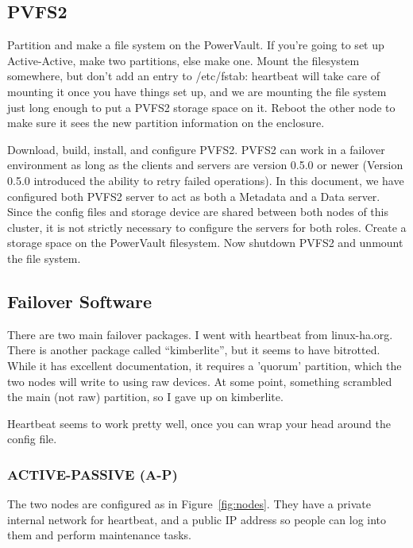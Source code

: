 \documentclass[11pt]{article}
\begin{document}
\subsection{PVFS2}

Partition and make a file system on the PowerVault.  If you're going to
set up Active-Active, make two partitions, else make one.  Mount the
filesystem somewhere, but don't add an entry to /etc/fstab: heartbeat
will take care of mounting it once you have things set up, and we are
mounting the file system just long enough to put a PVFS2 storage space
on it.  Reboot the other node to make sure it sees the new partition
information on the enclosure.

Download, build, install, and configure PVFS2.  PVFS2 can work in a
failover environment as long as the clients and servers are version
0.5.0 or newer (Version 0.5.0 introduced the ability to retry failed
operations). In this document, we have configured both PVFS2 server to
act as both a Metadata and a Data server.  Since the config files and
storage device are shared between both nodes of this cluster, it is not
strictly necessary to configure the servers for both roles. Create a
storage space on the PowerVault filesystem.  Now shutdown PVFS2 and
unmount the file system.  

\subsection{Failover Software}

There are two main failover packages.  I went with heartbeat from
linux-ha.org.  There is another package called ``kimberlite'', but it
seems to have bitrotted.  While it has excellent documentation, it
requires a 'quorum' partition, which the two nodes will write to using
raw devices.  At some point, something scrambled the main (not raw)
partition, so I gave up on kimberlite.  

Heartbeat seems to work pretty well, once you can wrap your head around
the config file.


\subsubsection{ACTIVE-PASSIVE (A-P)}

The two nodes are configured as in Figure~\ref{fig:nodes}.  They have a
private internal network for heartbeat, and a public IP address so
people can log into them and perform maintenance tasks.
\end{document}
